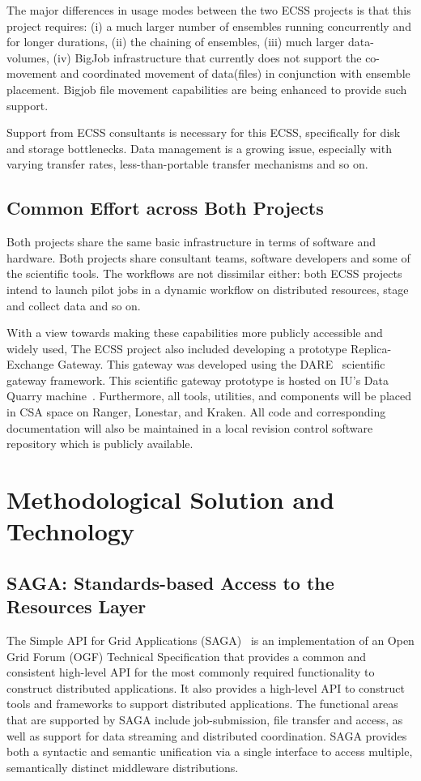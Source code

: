 \documentclass{sig-alternate}
\begin{document}
The major differences in usage modes between the two ECSS projects is that this
project requires: (i) a much larger number of ensembles running concurrently and
for longer durations, (ii) the chaining of ensembles, (iii) much larger
data-volumes, (iv)  BigJob infrastructure that currently does not support the
co-movement and coordinated movement of data(files) in conjunction with ensemble
placement. Bigjob file movement capabilities are being enhanced to provide
such support.

Support from ECSS consultants is necessary for this ECSS, specifically for disk
and storage bottlenecks. Data management is a growing issue, especially with
varying transfer rates, less-than-portable transfer mechanisms and so on.

\subsection{Common Effort across Both Projects}

Both projects share the same basic infrastructure in terms of software and
hardware. Both projects share consultant teams, software developers and some of
the scientific tools. The workflows are not dissimilar either: both ECSS
projects intend to launch pilot jobs in a dynamic workflow on distributed
resources, stage and collect data and so on.

With a view towards making these capabilities more publicly accessible and
widely used, The ECSS project also included developing a prototype
Replica-Exchange Gateway. This gateway was developed using the DARE~\cite{DARE}
scientific gateway framework. This scientific gateway prototype is hosted
on IU's Data Quarry machine~\cite{DataQuarry}. Furthermore, all tools,
utilities, and components will be placed in CSA space on Ranger,
Lonestar, and Kraken. All code and corresponding documentation will also be
maintained in a local revision control software repository which is publicly
available.


\section{Methodological Solution and Technology}


\subsection{SAGA: Standards-based Access to the Resources Layer}

The Simple API for Grid Applications (SAGA)~\cite{saga_url} is an
implementation of an Open Grid Forum (OGF) Technical Specification
that provides a common and consistent high-level API for the most
commonly required functionality to construct distributed applications.
It also provides a high-level API to construct tools and frameworks to
support distributed applications. The functional areas that are
supported by SAGA include job-submission, file transfer and access, as
well as support for data streaming and distributed coordination. SAGA
provides both a syntactic and semantic unification via a single
interface to access multiple, semantically distinct middleware
distributions.
\end{document}

